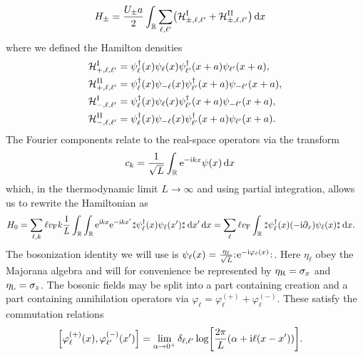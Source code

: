 \documentclass[english, parskip=full]{scrartcl}
\begin{document}
\begin{align}
H_\pm &= \frac{U_\pm a}{2} \intr{\sum_{\ell,\ell'} \kla*{\mathcal{H}_{\pm,\ell,\ell'}^\Text{I} + \mathcal{H}_{\pm,\ell,\ell'}^\Text{II}}}{x}
\end{align}
where we defined the Hamilton densities
\begin{align}
\mathcal{H}_{+,\ell,\ell'}^{\text{I}} &= \psi_{\ell}^\dagger(x) \psi_{\ell}(x) \psi_{\ell'}^\dagger(x+a) \psi_{\ell'}(x+a),\\
\mathcal{H}_{+,\ell,\ell'}^{\text{II}} &= \psi_{\ell}^\dagger(x) \psi_{-\ell}(x) \psi_{\ell'}^\dagger(x+a) \psi_{-\ell'}(x+a),\\
\mathcal{H}_{-,\ell,\ell'}^{\text{I}} &= \psi_{\ell}^\dagger(x) \psi_{\ell}(x) \psi_{\ell'}^\dagger(x+a) \psi_{-\ell'}(x+a),\\
\mathcal{H}_{-,\ell,\ell'}^{\text{II}} &= \psi_{\ell}^\dagger(x) \psi_{-\ell}(x) \psi_{\ell'}^\dagger(x+a) \psi_{\ell'}(x+a).
\end{align}
The Fourier components relate to the real-space operators via the transform
\begin{align}
c_k &= \frac{1}{\sqrt{L}} \int_{\mathbb{R}} \text{e}^{-\text{i} kx} \psi(x) \, \mathrm{d}x
\end{align}
which, in the thermodynamic limit $L\rightarrow\infty$ and using partial integration, allows us to rewrite the Hamiltonian as
\begin{align}
H_0 &= \sum_{\ell,k} \ell \vf k  \frac{1}{L}\intr{\intr{\powe{\i kx} \powe{-\i kx'} \varnormord{\psi_\ell^\dagger(x) \psi_\ell(x')}}{x'} }{x} = \sum_\ell \ell\vf \intr{ \varnormord{\psi_\ell^\dagger(x) (-\i\partial_x) \psi_\ell(x)} }{x}.
\end{align}
The bosonization identity we will use is $\psi_\ell(x) = \frac{\eta_\ell}{\sqrt{L}} {:\mathrel{\mspace{1mu}\text{e}^{-\text{i}\varphi_\ell(x)}\mspace{1mu}}:}$.
Here $\eta_\ell$ obey the Majorana algebra and will for convenience be represented by $\eta_{\text{R}} = \sigma_x$ and $\eta_{\text{L}} = \sigma_z$.
The bosonic fields may be split into a part containing creation and a part containing annihilation operators via $\varphi_\ell = \varphi_\ell^{(+)} + \varphi_\ell^{(-)}$.
These satisfy the commutation relations
\begin{align}
\klb*{\varphi_\ell^{(+)}(x), \varphi_{\ell'}^{(-)}(x')} &= \lim_{\alpha\rightarrow 0^+} \delta_{\ell,\ell'} \log\klb*{\frac{2\pi}{L} \kla*{\alpha + \i\ell(x-x')}}.
\end{align}
\end{document}
